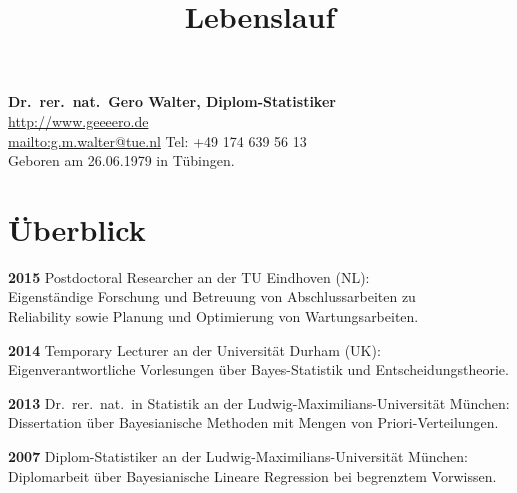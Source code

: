 \documentclass[a4paper]{simplecv}
\begin{document}
\pagestyle{myheadings}




\title{Lebenslauf}


\vspace*{-10ex}
\maketitle

\textbf{\large Dr.\ rer.\ nat.\ Gero Walter, Diplom-Statistiker}\\[2ex]
\url{http://www.geeeero.de}\\
\url{mailto:g.m.walter@tue.nl} \hfill Tel: +49 174 639 56 13\\

Geboren am 26.06.1979 in T\"{u}bingen.

\section{Überblick}
\begin{topic}
\item[\bfseries 2015] Postdoctoral Researcher an der TU Eindhoven (NL):\\
Eigenständige Forschung und Betreuung von Abschlussarbeiten zu\\ Reliability sowie Planung und Optimierung von Wartungsarbeiten.
\item[\bfseries 2014] Temporary Lecturer an der Universität Durham (UK):\\
Eigenverantwortliche Vorlesungen über Bayes-Statistik und Entscheidungstheorie.
\item[\bfseries 2013] Dr.\ rer.\ nat.\ in Statistik an der Ludwig-Maximilians-Universität München:
Dissertation über Bayesianische Methoden mit Mengen von Priori-Verteilungen.
\item[\bfseries 2007] Diplom-Statistiker an der Ludwig-Maximilians-Universität München:
Diplomarbeit über Bayesianische Lineare Regression bei begrenztem Vorwissen.
\end{topic}
\end{document}
